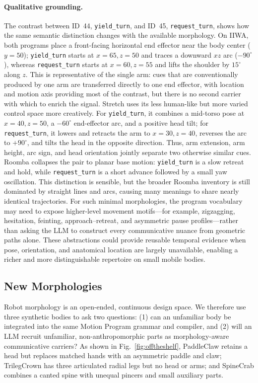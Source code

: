 \documentclass[letterpaper,10pt,conference]{ieeeconf}
\begin{document}
\paragraph{Qualitative grounding.} The contrast between ID~44, \texttt{yield\_turn}, and ID~45, \texttt{request\_turn}, shows how the same semantic distinction changes with the available morphology. On IIWA, both programs place a front-facing horizontal end effector near the body center ($y{=}50$); \texttt{yield\_turn} starts at $x{=}65,z{=}50$ and traces a downward $xz$ arc ($-90^\circ$), whereas \texttt{request\_turn} starts at $x{=}60,z{=}55$ and lifts the shoulder by $15^\circ$ along $z$. This is representative of the single arm: cues that are conventionally produced by one arm are transferred directly to one end effector, with location and motion axis providing most of the contrast, but there is no second carrier with which to enrich the signal. Stretch uses its less human-like but more varied control space more creatively. For \texttt{yield\_turn}, it combines a mid-torso pose at $x{=}40,z{=}50$, a $-60^\circ$ end-effector arc, and a positive head tilt; for \texttt{request\_turn}, it lowers and retracts the arm to $x{=}30,z{=}40$, reverses the arc to $+90^\circ$, and tilts the head in the opposite direction. Thus, arm extension, arm height, arc sign, and head orientation jointly separate two otherwise similar cues. Roomba collapses the pair to planar base motion: \texttt{yield\_turn} is a slow retreat and hold, while \texttt{request\_turn} is a short advance followed by a small yaw oscillation. This distinction is sensible, but the broader Roomba inventory is still dominated by straight lines and arcs, causing many meanings to share nearly identical trajectories. For such minimal morphologies, the program vocabulary may need to expose higher-level movement motifs---for example, zigzagging, hesitation, feinting, approach--retreat, and asymmetric pause profiles---rather than asking the LLM to construct every communicative nuance from geometric paths alone. These abstractions could provide reusable temporal evidence when pose, orientation, and anatomical location are largely unavailable, enabling a richer and more distinguishable repertoire on small mobile bodies.

\subsection{New Morphologies}
Robot morphology is an open-ended, continuous design space. We therefore use three synthetic bodies to ask two questions: (1) can an unfamiliar body be integrated into the same Motion Program grammar and compiler, and (2) will an LLM recruit unfamiliar, non-anthropomorphic parts as morphology-aware communicative carriers? As shown in Fig.~\ref{fig:offtheshelf}, PaddleClaw retains a head but replaces matched hands with an asymmetric paddle and claw; TrilegCrown has three articulated radial legs but no head or arms; and SpineCrab combines a canted spine with unequal pincers and small auxiliary parts.
\end{document}
